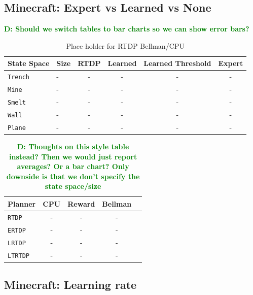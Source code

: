 \documentclass[conference]{IEEEtran}
\newcommand{\dnote}[1]{\textcolor{Green}{\textbf{D: #1}}}
\begin{document}
\subsection{Minecraft: Expert vs Learned vs None}

\dnote{Should we switch tables to bar charts so we can show error bars?}

\begin{table}[H]
\centering
\begin{tabular}{ l  l || c c c c }
  State Space 		&	Size 	&	RTDP 	& Learned 	& Learned Threshold & Expert 	\\ \hline
  \texttt{Trench}  	& 	-	&	-	&	-		&	-	&	-	\\
  \texttt{Mine}  		& 	-	&	-	&	-		&	-   	&	-	\\
  \texttt{Smelt}  		& 	-	&	-	&	-		&	-	&	-	\\
  \texttt{Wall}  		& 	-	&	-	&	-		&	-	&	-	\\
  \texttt{Plane}  		& 	-	&	-	&	-		&	- 	&	-	\\
\end{tabular}
\caption{Place holder for RTDP Bellman/CPU}
\label{table:minecraft_results_bellman}
\end{table}

\begin{table}[H]
\centering
\begin{tabular}{ l  | c c c c}
  Planner 				&	CPU	&	Reward 	& Bellman \\ \hline
  \texttt{RTDP}  			& 	-	&	-		&	-		\\
  \texttt{ERTDP}  		& 	-	&	-		&	-		\\
  \texttt{LRTDP}  		& 	-	&	-		&	-		\\
  \texttt{LTRTDP}  		& 	-	&	-		&	-		\\
\end{tabular}
\caption{\dnote{Thoughts on this style table instead? Then we would just report averages? Or a bar chart? Only downside is that we don't specify
the state space/size}}
\label{table:minecraft_results_bellman}
\end{table}


\subsection{Minecraft: Learning rate}
\end{document}
